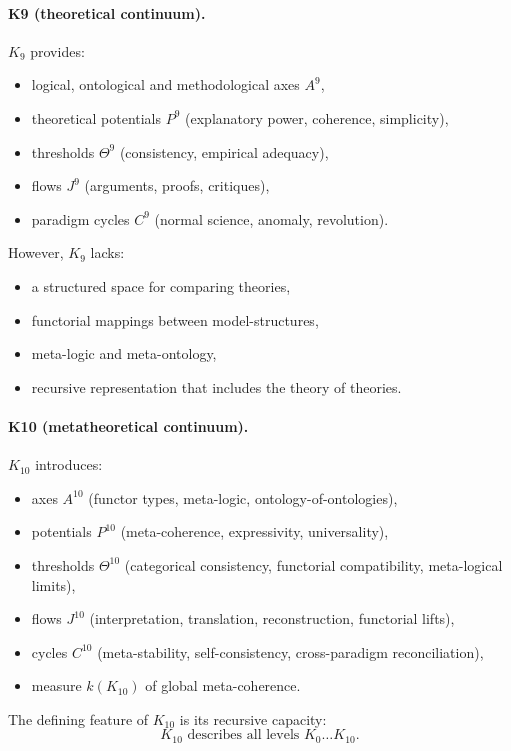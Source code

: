 \paragraph{K9 (theoretical continuum).}
$K_9$ provides:
\begin{itemize}
  \item logical, ontological and methodological axes $A^9$,
  \item theoretical potentials $P^9$ (explanatory power, coherence, simplicity),
  \item thresholds $\Theta^9$ (consistency, empirical adequacy),
  \item flows $J^9$ (arguments, proofs, critiques),
  \item paradigm cycles $C^9$ (normal science, anomaly, revolution).
\end{itemize}

However, $K_9$ lacks:
\begin{itemize}
  \item a structured space for comparing theories,
  \item functorial mappings between model-structures,
  \item meta-logic and meta-ontology,
  \item recursive representation that includes the theory of theories.
\end{itemize}

\paragraph{K10 (metatheoretical continuum).}
$K_{10}$ introduces:
\begin{itemize}
  \item axes $A^{10}$ (functor types, meta-logic, ontology-of-ontologies),
  \item potentials $P^{10}$ (meta-coherence, expressivity, universality),
  \item thresholds $\Theta^{10}$ (categorical consistency, functorial
        compatibility, meta-logical limits),
  \item flows $J^{10}$ (interpretation, translation, reconstruction,
        functorial lifts),
  \item cycles $C^{10}$ (meta-stability, self-consistency,
        cross-paradigm reconciliation),
  \item measure $k(K_{10})$ of global meta-coherence.
\end{itemize}

The defining feature of $K_{10}$ is its recursive capacity:
\[
K_{10} \text{ describes all levels } K_0\dots K_{10}.
\]

